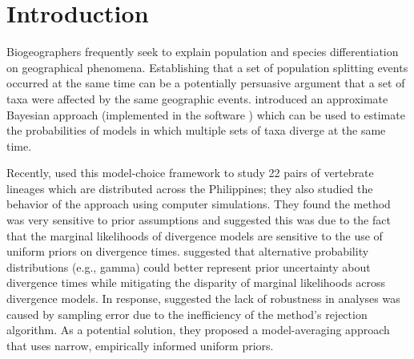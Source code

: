 \section{Introduction}
Biogeographers frequently seek to explain population and species
differentiation on geographical phenomena.
Establishing that a set of population splitting events occurred
at the same time can be a potentially persuasive argument that a set of taxa
were affected by the same geographic events.
\citet{Huang2011} introduced an approximate Bayesian approach (implemented
in the software \msb) which can be used to estimate the probabilities of
models in which multiple sets of taxa diverge at the same time. 

Recently, \citet{Oaks2012} used this model-choice framework to 
study 22 pairs of vertebrate lineages which are distributed across
the Philippines; they also studied the behavior of the \msb approach
using computer simulations.
They found the method was very sensitive to prior assumptions and suggested
this was due to the fact that the marginal likelihoods of divergence models are
sensitive to the use of uniform priors on divergence times.
\citet{Oaks2012} suggested that alternative probability distributions (e.g.,
gamma) could better represent prior uncertainty about divergence times while
mitigating the disparity of marginal likelihoods across divergence models.
In response, \citet{Hickerson2013} suggested the lack of robustness in \msb
analyses was caused by sampling error due to the inefficiency of the method's
rejection algorithm.
As a potential solution, they proposed a model-averaging approach that uses
narrow, empirically informed uniform priors.

